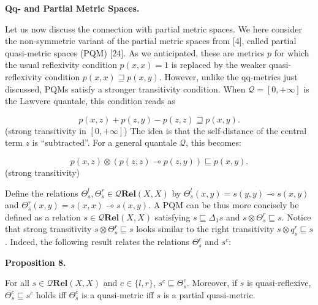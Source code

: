  
 
 
\par\medskip\noindent\textbf{Qq- and Partial Metric Spaces.}\par
 
 
Let us now discuss the connection with partial metric spaces. We here consider the non-symmetric variant of the partial metric spaces from [4], called partial quasi-metric spaces (PQM) [24]. As we anticipated, these are metrics $p$ for which the usual reflexivity condition $p(x,x)=1$ is replaced by the weaker quasi-reflexivity condition $p(x,x)\sqsupseteq p(x,y)$. However, unlike the qq-metrics just discussed, PQMs satisfy a stronger transitivity condition. When $\mathcal{Q}=[0,+\infty]$ is the Lawvere quantale, this condition reads as\par
    \[p(x,z)+p(z,y)-p(z,z)\sqsupseteq p(x,y).\]  (strong transitivity in $[0,+\infty]$)   
The idea is that the self-distance of the central term $z$ is “subtracted”. For a general quantale $\mathcal{Q}$, this becomes:\par
    \[p(x,z)\otimes(p(z,z)\multimap p(z,y))\sqsubseteq p(x,y).\]  (strong transitivity)   
 
 
Define the relations $\Theta^{l}_{s},\Theta^{r}_{s}\in\mathcal{Q}\mathbf{Rel}(X,X)$ by $\Theta^{l}_{s}(x,y)=s(y,y)\multimap s(x,y)$ and $\Theta^{r}_{s}(x,y)=s(x,x)\multimap s(x,y)$. A PQM can be thus more concisely be defined as a relation $s\in\mathcal{Q}\mathbf{Rel}(X,X)$ satisfying $s\sqsubseteq\Delta_{1}s$ and $s\otimes\Theta^{r}_{s}\sqsubseteq s$. Notice that strong transitivity $s\otimes\Theta^{r}_{s}\sqsubseteq s$ looks similar to the right transitivity $s\otimes q^{r}_{s}\sqsubseteq s$. Indeed, the following result relates the relations $\Theta^{c}_{s}$ and $s^{c}$:\par
 
 
 
\par\medskip\noindent\textbf{Proposition 8.}\par
 
 
For all $s\in\mathcal{Q}\mathbf{Rel}(X,X)$ and $c\in\{l,r\}$, $s^{c}\sqsubseteq\Theta^{c}_{s}$. Moreover, if $s$ is quasi-reflexive, $\Theta^{c}_{s}\sqsubseteq s^{c}$ holds iff $\Theta^{c}_{s}$ is a quasi-metric iff $s$ is a partial quasi-metric.\par
 
